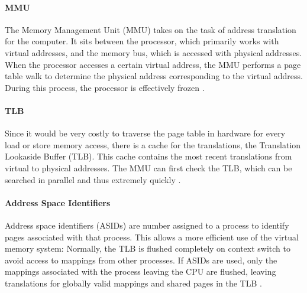 
\paragraph{MMU}
The Memory Management Unit (MMU) takes on the task of address translation for the computer.
It sits between the processor, which primarily works with virtual addresses, and the memory bus,
which is accessed with physical addresses. When the processor accesses a certain virtual address,
the MMU performs a page table walk to determine the physical address corresponding to the virtual
address. During this process, the processor is effectively frozen \cite{jacobVirtualMemoryContemporary1998}.


\paragraph{TLB} Since it would be very costly to traverse the page table in hardware for every load or store memory access, there is a cache for the translations, the Translation Lookaside Buffer (TLB). This cache contains the most recent translations from virtual to physical addresses. The MMU can first check the TLB, which can be searched in parallel and thus extremely quickly \cite{drepper2007every,jacobVirtualMemoryContemporary1998}.




\paragraph{Address Space Identifiers}
Address space identifiers (ASIDs) are number assigned to a process to identify pages associated with that process. This allows a more efficient use of the virtual memory system: Normally, the TLB is flushed completely on context switch to avoid access to mappings from other processes. If ASIDs are used, only the mappings associated with the process leaving the CPU are flushed, leaving translations for globally valid mappings and shared pages in the TLB \cite{RISCVInstructionSet}.


